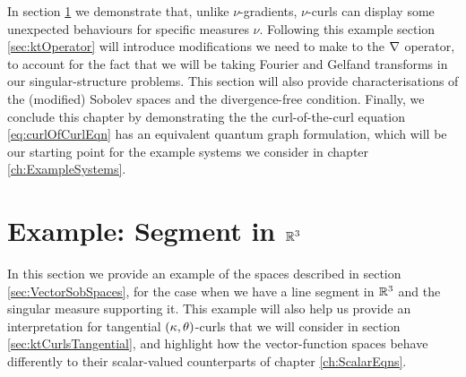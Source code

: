 In section \ref{sec:CurlExamples} we demonstrate that, unlike $\nu$-gradients, $\nu$-curls can display some unexpected behaviours for specific measures $\nu$.
Following this example section \ref{sec:ktOperator} will introduce modifications we need to make to the $\nabla$ operator, to account for the fact that we will be taking Fourier and Gelfand transforms in our singular-structure problems.
This section will also provide characterisations of the (modified) Sobolev spaces and the divergence-free condition.
Finally, we conclude this chapter by demonstrating the the curl-of-the-curl equation \eqref{eq:curlOfCurlEqn} has an equivalent quantum graph formulation, which will be our starting point for the example systems we consider in chapter \ref{ch:ExampleSystems}.

\section{Example: Segment in $\mathbb{R}^3$} \label{sec:CurlExamples}
In this section we provide an example of the spaces described in section \ref{sec:VectorSobSpaces}, for the case when we have a line segment in $\mathbb{R}^3$ and the singular measure supporting it. 
This example will also help us provide an interpretation for tangential $\left( \kappa, \theta \right)$-curls that we will consider in section \ref{sec:ktCurlsTangential}, and highlight how the vector-function spaces behave differently to their scalar-valued counterparts of chapter \ref{ch:ScalarEqns}. \newline


